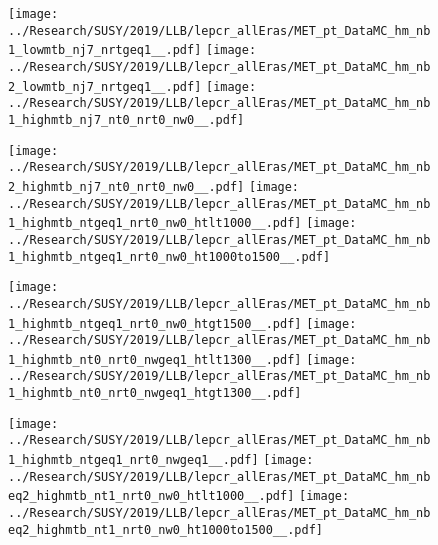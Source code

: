 \begin{figure}[!htb]
  \texttt{[image: ../Research/SUSY/2019/LLB/lepcr\_allEras/MET\_pt\_DataMC\_hm\_nb1\_lowmtb\_nj7\_nrtgeq1\_\_.pdf]}
\endminipage\hfill
{}
  \texttt{[image: ../Research/SUSY/2019/LLB/lepcr\_allEras/MET\_pt\_DataMC\_hm\_nb2\_lowmtb\_nj7\_nrtgeq1\_\_.pdf]}
\endminipage\hfill
{}
  \texttt{[image: ../Research/SUSY/2019/LLB/lepcr\_allEras/MET\_pt\_DataMC\_hm\_nb1\_highmtb\_nj7\_nt0\_nrt0\_nw0\_\_.pdf]}
\endminipage
\end{figure}

\begin{figure}[!htb]
  \texttt{[image: ../Research/SUSY/2019/LLB/lepcr\_allEras/MET\_pt\_DataMC\_hm\_nb2\_highmtb\_nj7\_nt0\_nrt0\_nw0\_\_.pdf]}
\endminipage\hfill
{}
  \texttt{[image: ../Research/SUSY/2019/LLB/lepcr\_allEras/MET\_pt\_DataMC\_hm\_nb1\_highmtb\_ntgeq1\_nrt0\_nw0\_htlt1000\_\_.pdf]}
\endminipage\hfill
{}
  \texttt{[image: ../Research/SUSY/2019/LLB/lepcr\_allEras/MET\_pt\_DataMC\_hm\_nb1\_highmtb\_ntgeq1\_nrt0\_nw0\_ht1000to1500\_\_.pdf]}
\endminipage
\end{figure}

\begin{figure}[!htb]
  \texttt{[image: ../Research/SUSY/2019/LLB/lepcr\_allEras/MET\_pt\_DataMC\_hm\_nb1\_highmtb\_ntgeq1\_nrt0\_nw0\_htgt1500\_\_.pdf]}
\endminipage\hfill
{}
  \texttt{[image: ../Research/SUSY/2019/LLB/lepcr\_allEras/MET\_pt\_DataMC\_hm\_nb1\_highmtb\_nt0\_nrt0\_nwgeq1\_htlt1300\_\_.pdf]}
\endminipage\hfill
{}
  \texttt{[image: ../Research/SUSY/2019/LLB/lepcr\_allEras/MET\_pt\_DataMC\_hm\_nb1\_highmtb\_nt0\_nrt0\_nwgeq1\_htgt1300\_\_.pdf]}
\endminipage
\end{figure}



\begin{figure}[!htb]
  \texttt{[image: ../Research/SUSY/2019/LLB/lepcr\_allEras/MET\_pt\_DataMC\_hm\_nb1\_highmtb\_ntgeq1\_nrt0\_nwgeq1\_\_.pdf]}
\endminipage\hfill
{}
  \texttt{[image: ../Research/SUSY/2019/LLB/lepcr\_allEras/MET\_pt\_DataMC\_hm\_nbeq2\_highmtb\_nt1\_nrt0\_nw0\_htlt1000\_\_.pdf]}
\endminipage\hfill
{}
  \texttt{[image: ../Research/SUSY/2019/LLB/lepcr\_allEras/MET\_pt\_DataMC\_hm\_nbeq2\_highmtb\_nt1\_nrt0\_nw0\_ht1000to1500\_\_.pdf]}
\endminipage
\end{figure}

